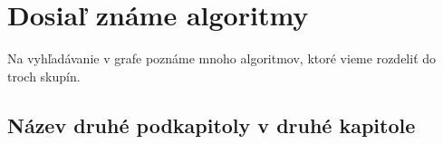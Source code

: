 \chapter{Dosiaľ známe algoritmy}
Na vyhľadávanie v grafe poznáme mnoho algoritmov, ktoré vieme rozdeliť do troch skupín.
\section{}




\section{Název druhé podkapitoly v druhé kapitole}

